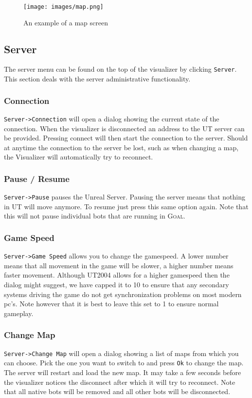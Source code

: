 \documentclass[11pt,a4paper]{article}
\newcommand{\Goal}{\textsc{Goal}}
\begin{document}
\begin{figure}[h!]
\centering
\texttt{[image: images/map.png]}
\caption{An example of a map screen}\label{fig:map}
\end{figure}


\subsection{Server}
The server menu can be found on the top of the visualizer by clicking \texttt{Server}. This section deals with the server administrative functionality.

\subsubsection*{Connection}
\texttt{Server->Connection} will open a dialog showing the current state of the connection. When the visualizer is disconnected an address to the UT server can be provided. Pressing connect will then start the connection to the server.  Should at anytime the connection to the server be lost, such as when changing a map, the Visualizer will automatically try to reconnect.

\subsubsection*{Pause / Resume}
\texttt{Server->Pause} pauses the Unreal Server. Pausing the server means that nothing in UT will move anymore. To resume just press this same option again. Note that this will not pause individual bots that are running in \Goal. %

\subsubsection*{Game Speed}
\texttt{Server->Game Speed} allows you to change the gamespeed. A lower number means that all movement in the game will be slower, a higher number means faster movement. Although UT2004 allows for a higher gamespeed then the dialog might suggest, we have capped it to 10 to ensure that any secondary systems driving the game do not get synchronization problems on most modern pc's. Note however that it is best to leave this set to 1 to ensure normal gameplay.

\subsubsection*{Change Map}
\texttt{Server->Change Map} will open a dialog showing a list of maps from which you can choose. Pick the one you want to switch to and press \texttt{Ok} to change the map. The server will restart and load the new map. It may take a few seconds before the visualizer notices the disconnect after which it will try to reconnect. Note that all native bots will be removed and all other bots will be disconnected. 
\end{document}
